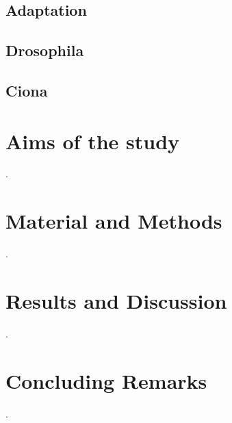 \documentclass[officiallayout]{tktla_modified}
\begin{document}
	\section{Adaptation}
	
	\clearpage
	\section{Drosophila}
	
	\clearpage
	\section{Ciona}
	
	\clearpage

\chapter{Aims of the study}
.


\chapter{Material and Methods}
.


\chapter{Results and Discussion}
.



\chapter{Concluding Remarks}
.


\listoffigures

%


\end{document}
